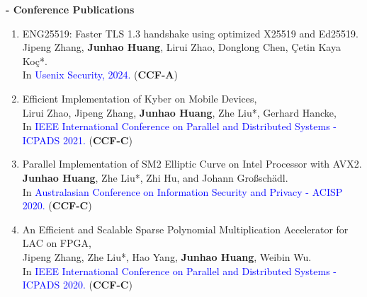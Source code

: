 \documentclass[letterpaper,11pt]{article}
\begin{document}
\textbf{- Conference Publications}
\begin{enumerate}\setlength{\itemsep}{0pt}
	\item {ENG25519: Faster TLS 1.3 handshake using optimized X25519 and Ed25519.\\ 
	Jipeng Zhang, \textbf{Junhao Huang}, Lirui Zhao, Donglong Chen, Çetin Kaya Koç*.\\ 
	In \textcolor{blue}{Usenix Security, 2024.} (\textbf{CCF-A})
	}

	\item {Efficient Implementation of Kyber on Mobile Devices,\\
	Lirui Zhao, Jipeng Zhang, \textbf{Junhao Huang}, Zhe Liu*, Gerhard Hancke,\\
	In \textcolor{blue}{IEEE International Conference on Parallel and Distributed Systems - ICPADS 2021.} (\textbf{CCF-C})
	}

	\item {Parallel Implementation of SM2 Elliptic Curve on Intel Processor with AVX2. \\\textbf{Junhao Huang}, Zhe Liu*, Zhi Hu, and Johann Großschädl. \\ In \textcolor{blue}{Australasian Conference on Information Security and Privacy - ACISP 2020. } (\textbf{CCF-C})
	}

	\item {An Efficient and Scalable Sparse Polynomial Multiplication Accelerator for LAC on FPGA,\\
	Jipeng Zhang, Zhe Liu*, Hao Yang, \textbf{Junhao Huang}, Weibin Wu. \\
	In \textcolor{blue}{IEEE International Conference on Parallel and Distributed Systems - ICPADS 2020.} (\textbf{CCF-C})
	}

\end{enumerate}
\end{document}
